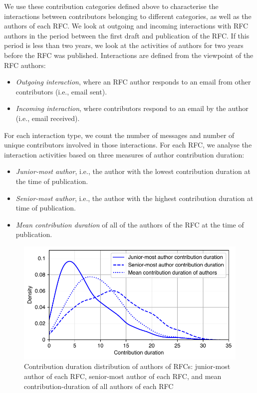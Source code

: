 \documentclass[twocolumn,10pt]{article}
\newlength{\figureWidthOneColumn}
\begin{document}
We use these contribution categories defined above to characterise the
interactions between contributors belonging to different categories, as
well as the authors of each RFC. We look at outgoing and incoming
interactions with RFC authors in the period between the first draft and
publication of the RFC. If this period is less than two years, we look at
the activities of authors for two years before the RFC was published.
Interactions are defined from the viewpoint of the RFC authors:

\begin{itemize}
  \item \textit{Outgoing interaction}, where an RFC author responds
    to an email from other contributors (i.e., email sent).

  \item \textit{Incoming interaction}, where contributors respond to
    an email by the author (i.e., email received).
\end{itemize}

For each interaction type, we count the number of messages and number of
unique contributors involved in those interactions. For each RFC, we
analyse the interaction activities based on three measures of author
contribution duration:

\begin{itemize}
  \item \emph{Junior-most author}, i.e., the author with the lowest
    contribution duration at the time of publication.
  \item \emph{Senior-most author}, i.e., the author with the highest
    contribution duration at time of publication.
  \item \emph{Mean contribution duration} of all of the authors of the
    RFC at the time of publication.
\end{itemize}

\begin{figure}
  \centering
  \includegraphics[width=\figureWidthOneColumn]{figures-prev/imc-2021/emails/age_authors_RFCs.pdf}
  \caption{
    Contribution duration distribution of authors of RFCs:
    junior-most author of each RFC, senior-most author of
    each RFC, and mean contribution-duration of all authors
    of each RFC
  }
\label{fig:age_dist_rfc_authors}
\end{figure}
\end{document}
